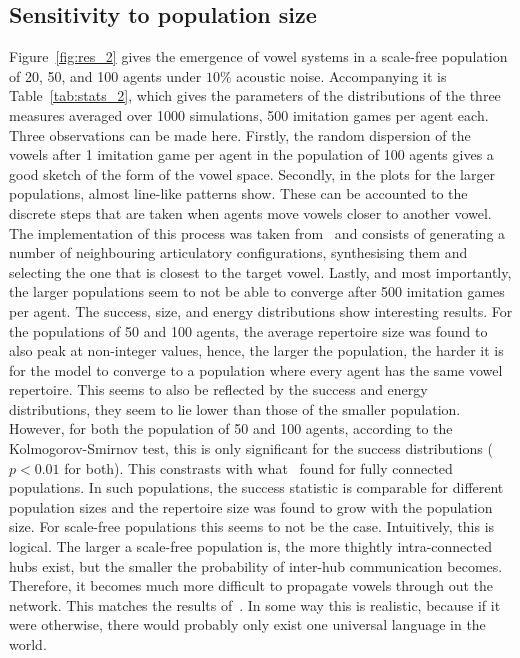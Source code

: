 \documentclass[11pt]{article}
\begin{document}
\subsection{Sensitivity to population size}
Figure~\ref{fig:res_2} gives the emergence of vowel systems in a scale-free population of 20, 50, and 100 agents under $10\%$ acoustic noise.
Accompanying it is Table~\ref{tab:stats_2}, which gives the parameters of the distributions of the three measures averaged over 1000 simulations, 500 imitation
games per agent each. Three observations can be made here. Firstly, the random dispersion of the vowels after 1 imitation game per agent in the population of 100
agents gives a good sketch of the form of the vowel space. Secondly, in the plots for the larger populations, almost line-like patterns show.
These can be accounted to the discrete steps that are taken when agents move vowels closer to another vowel. The implementation of this process was taken
from~ and consists of generating a number of neighbouring articulatory configurations, synthesising them and selecting the one
that is closest to the target vowel. Lastly, and most importantly, the larger populations seem to not be able to converge after 500 imitation games per agent.
The success, size, and energy distributions show interesting results. For the populations of 50 and 100 agents, the average repertoire size was found to also peak at non-integer values, hence, the
larger the population, the harder it is for the model to converge to a population where every agent has the same vowel repertoire.
This seems to also be reflected by the success and energy distributions, they seem to lie lower than those of the smaller population.
However, for both the population of 50 and 100 agents, according to the Kolmogorov-Smirnov test, this is only significant for the success distributions ($p<0.01$ for both).
This constrasts with what~ found for fully connected populations.
In such populations, the success statistic is comparable for different population sizes and the repertoire size was found to grow with the population size.
For scale-free populations this seems to not be the case. Intuitively, this is logical. The larger a scale-free population is, the more thightly intra-connected hubs exist, but the smaller
the probability of inter-hub communication becomes. Therefore, it becomes much more difficult to propagate vowels through out the network.
This matches the results of~.
In some way this is realistic, because if it were otherwise, there would probably only exist one universal language in the world.
\end{document}
